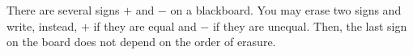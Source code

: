 There are several signs $+$ and $-$ on a blackboard. You may erase two signs and write, instead, $+$ if they are equal and $-$ if they are unequal. Then, the last sign on the board does not depend on the order of erasure.
